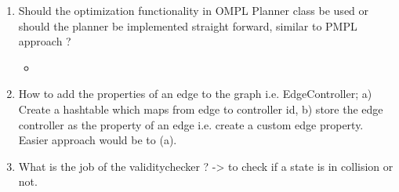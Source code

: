 \begin{enumerate}
 \item Should the optimization functionality in OMPL Planner class be used or should the planner be implemented straight forward, similar to PMPL approach ?
    \begin{itemize}
     \item 
    \end{itemize}
\item How to add the properties of an edge to the graph i.e. EdgeController; a) Create a hashtable which maps from edge to controller id, b) store the edge controller as the property of an edge i.e. create a custom edge property. Easier approach would be to (a).

 \item What is the job of the validitychecker ? -> to check if a state is in collision or not. 

\end{enumerate}

